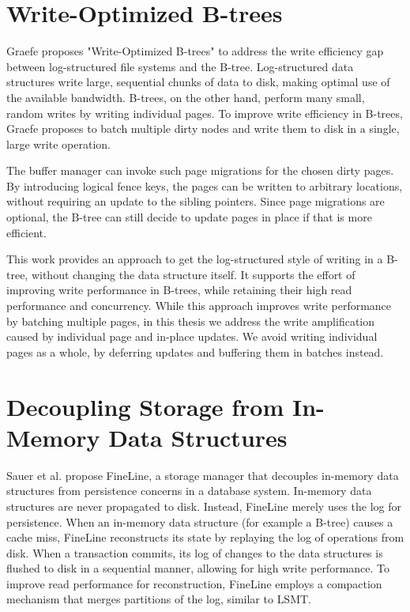 \section{Write-Optimized B-trees}
Graefe proposes "Write-Optimized B-trees" \cite{graefe2004write} to address the write efficiency gap between log-structured file systems and the B-tree.
Log-structured data structures write large, sequential chunks of data to disk, making optimal use of the available bandwidth.
B-trees, on the other hand, perform many small, random writes by writing individual pages.
To improve write efficiency in B-trees, Graefe proposes to batch multiple dirty nodes and write them to disk in a single, large write operation.

The buffer manager can invoke such page migrations for the chosen dirty pages.
By introducing logical fence keys, the pages can be written to arbitrary locations, without requiring an update to the sibling pointers.
Since page migrations are optional, the B-tree can still decide to update pages in place if that is more efficient.

This work provides an approach to get the log-structured style of writing in a B-tree, without changing the data structure itself.
It supports the effort of improving write performance in B-trees, while retaining their high read performance and concurrency.
While this approach improves write performance by batching multiple pages, in this thesis we address the write amplification caused by individual page and in-place updates.
We avoid writing individual pages as a whole, by deferring updates and buffering them in batches instead.

\section{Decoupling Storage from In-Memory Data Structures}
Sauer et al. \cite{sauer2018fineline} propose FineLine, a storage manager that decouples in-memory data structures from persistence concerns in a database system.
In-memory data structures are never propagated to disk.
Instead, FineLine merely uses the log for persistence.
When an in-memory data structure (for example a B-tree) causes a cache miss, FineLine reconstructs its state by replaying the log of operations from disk.
When a transaction commits, its log of changes to the data structures is flushed to disk in a sequential manner, allowing for high write performance.
To improve read performance for reconstruction, FineLine employs a compaction mechanism that merges partitions of the log, similar to \ac{LSMT}.

